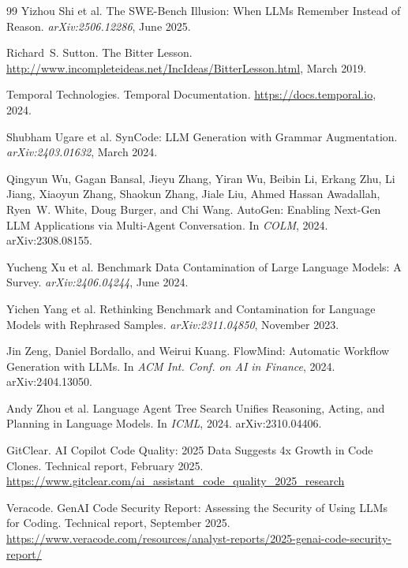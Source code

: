 \documentclass[11pt]{article}
\begin{document}
\begin{thebibliography}{99}
Yizhou Shi et al.
\newblock The SWE-Bench Illusion: When LLMs Remember Instead of Reason.
\newblock \emph{arXiv:2506.12286}, June 2025.

Richard~S. Sutton.
\newblock The Bitter Lesson.
\newblock \url{http://www.incompleteideas.net/IncIdeas/BitterLesson.html}, March 2019.

Temporal Technologies.
\newblock Temporal Documentation.
\newblock \url{https://docs.temporal.io}, 2024.

Shubham Ugare et al.
\newblock SynCode: LLM Generation with Grammar Augmentation.
\newblock \emph{arXiv:2403.01632}, March 2024.

Qingyun Wu, Gagan Bansal, Jieyu Zhang, Yiran Wu, Beibin Li, Erkang Zhu, Li Jiang, Xiaoyun Zhang, Shaokun Zhang, Jiale Liu, Ahmed Hassan Awadallah, Ryen~W. White, Doug Burger, and Chi Wang.
\newblock AutoGen: Enabling Next-Gen LLM Applications via Multi-Agent Conversation.
\newblock In \emph{COLM}, 2024.
\newblock arXiv:2308.08155.

Yucheng Xu et al.
\newblock Benchmark Data Contamination of Large Language Models: A Survey.
\newblock \emph{arXiv:2406.04244}, June 2024.

Yichen Yang et al.
\newblock Rethinking Benchmark and Contamination for Language Models with Rephrased Samples.
\newblock \emph{arXiv:2311.04850}, November 2023.

Jin Zeng, Daniel Bordallo, and Weirui Kuang.
\newblock FlowMind: Automatic Workflow Generation with LLMs.
\newblock In \emph{ACM Int. Conf. on AI in Finance}, 2024.
\newblock arXiv:2404.13050.

Andy Zhou et al.
\newblock Language Agent Tree Search Unifies Reasoning, Acting, and Planning in Language Models.
\newblock In \emph{ICML}, 2024.
\newblock arXiv:2310.04406.

GitClear.
\newblock AI Copilot Code Quality: 2025 Data Suggests 4x Growth in Code Clones.
\newblock Technical report, February 2025.
\newblock \url{https://www.gitclear.com/ai_assistant_code_quality_2025_research}

Veracode.
 GenAI Code Security Report: Assessing the Security of Using LLMs for Coding.
\newblock Technical report, September 2025.
\newblock \url{https://www.veracode.com/resources/analyst-reports/2025-genai-code-security-report/}


\end{thebibliography}
\end{document}
